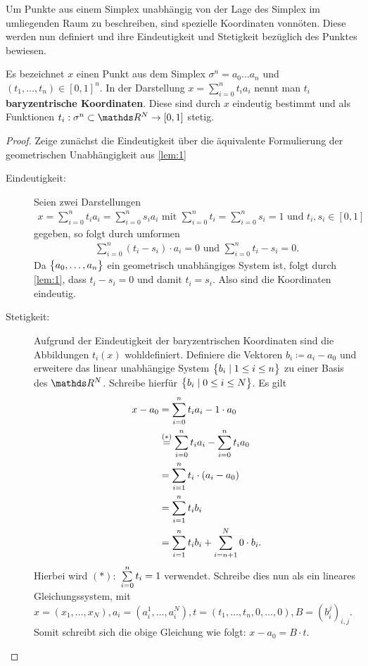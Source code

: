 Um Punkte aus einem Simplex unabhängig von der Lage des Simplex im
umliegenden Raum zu beschreiben, sind spezielle Koordinaten
vonnöten. Diese werden nun definiert und ihre Eindeutigkeit und
Stetigkeit bezüglich des Punktes bewiesen.


\begin{Lem}\label{lem:bary}
  \normalfont Es bezeichnet $x$ einen Punkt aus dem Simplex
  $\sigma^n = a_0\ldots a_n$ und $(t_1,\ldots ,t_n) \in [0,1]^n$. In
  der Darstellung $x = \sum_{i=0}^n t_i a_i$ nennt man $t_i$
  \textbf{baryzentrische Koordinaten}. Diese sind durch $x$ eindeutig
  bestimmt und als Funktionen
  $t_i : \sigma^n \subset \R^N \rightarrow [0,1]$ stetig.
  \begin{proof}
    Zeige zunächst die Eindeutigkeit über die äquivalente
    Formulierung der geometrischen Unabhängigkeit aus \cref{lem:1}
    \begin{description}
    \item[Eindeutigkeit: ] Seien zwei Darstellungen
      \begin{gather*}
        x = \sum\limits_{i=0}^n t_i a_i = \sum\limits_{i=0}^n s_i a_i
        \text{ mit } \sum\limits_{i=0}^n t_i = \sum\limits_{i=0}^n s_i
        = 1 \text{ und } t_i,s_i \in [0,1]
      \end{gather*}
      gegeben, so folgt durch umformen
      \begin{gather*}
        \sum\limits_{i=0}^n (t_i - s_i ) \cdot a_i = 0 \text{ und }
        \sum\limits_{i=0}^n t_i - s_i = 0.
      \end{gather*}
      Da $\sset{a_0 , \ldots , a_n}$ ein geometrisch unabhängiges
      System ist, folgt durch \cref{lem:1}, dass $t_i - s_i = 0 $ und
      damit $ t_i = s_i$. Also sind die Koordinaten eindeutig.
    \item[Stetigkeit: ] Aufgrund der Eindeutigkeit der baryzentrischen
      Koordinaten sind die Abbildungen $t_i (x)$ wohldefiniert.
      Definiere die Vektoren $b_i \coloneqq a_i - a_0$ und erweitere
      das linear unabhängige System $\set{ b_i }{ 1 \leq i \leq n}$ zu
      einer Basis des $\R^N$. Schreibe hierfür
      $\set{ b_i }{ 0 \leq i \leq N}$. Es gilt
      \begin{align*}
        x - a_0 &= \sp{0}{n} t_i a_i - 1 \cdot a_0\\
                &\overset{(*)}{=} \sp{0}{n} t_i a_i - \sp{0}{n} t_i a_0\\
                &= \sp{1}{n} t_i \cdot (a_i - a_0)\\
                &= \sp{1}{n} t_i b_i\\
                &= \sp{1}{n} t_i b_i + \sp{n+1}{N} 0 \cdot b_i.
      \end{align*}
      Hierbei wird $(*):$ $\sp{0}{n} t_i = 1$ verwendet. Schreibe dies
      nun als ein lineares Gleichungssystem, mit
      $x=(x_1,\ldots,x_N),a_i=(a_i^1,\ldots,a_i^N),%
      t=(t_1,\ldots,t_n,0,\ldots,0),B=(b_i^j)_{i,j}$.
      Somit schreibt sich die obige Gleichung wie folgt:
      $x-a_0 = B\cdot t$.
     

\end{description}
\end{proof}
\end{Lem}

